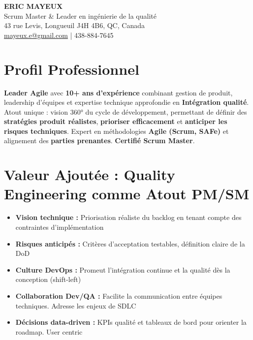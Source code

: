 \documentclass[11pt,a4paper]{article}
\newcommand{\highlight}[1]{\textcolor{primaryblue}{\textbf{#1}}}
\newcommand{\keypoint}[1]{\textbf{#1}}
\begin{document}
\begin{center}
    {\LARGE \textbf{ERIC MAYEUX}}\\
    \vspace{2pt}
    {\normalsize Scrum Master & Leader en ingénierie de la qualité}\\
    \vspace{3pt}
    43 rue Levis, Longueuil J4H 4B6, QC, Canada\\
    \href{mailto:mayeux.e@gmail.com}{mayeux.e@gmail.com} | 438-884-7645
\end{center}

\vspace{6pt}

\section*{Profil Professionnel}
\noindent
\highlight{Leader Agile} avec \keypoint{10+ ans d'expérience} combinant gestion de produit, leadership d'équipes et expertise technique approfondie en \highlight{Intégration qualité}. Atout unique : vision 360° du cycle de développement, permettant de définir des \highlight{stratégies produit réalistes}, \highlight{prioriser efficacement} et \highlight{anticiper les risques techniques}. Expert en méthodologies \highlight{Agile (Scrum, SAFe)} et alignement des \highlight{parties prenantes}. \highlight{Certifié Scrum Master}.

\section*{Valeur Ajoutée : Quality Engineering comme Atout PM/SM}
\begin{itemize}[leftmargin=10pt]
    \item \highlight{Vision technique :} Priorisation réaliste du backlog en tenant compte des contraintes d'implémentation
    \item \highlight{Risques anticipés :} Critères d'acceptation testables, définition claire de la DoD
    \item \highlight{Culture DevOps :} Promeut l'intégration continue et la qualité dès la conception (shift-left)
    \item \highlight{Collaboration Dev/QA :} Facilite la communication entre équipes techniques. Adresse les enjeux de SDLC
    \item \highlight{Décisions data-driven :} KPIs qualité et tableaux de bord pour orienter la roadmap. User centric
\end{itemize}
\nopagebreak[4]
\end{document}
